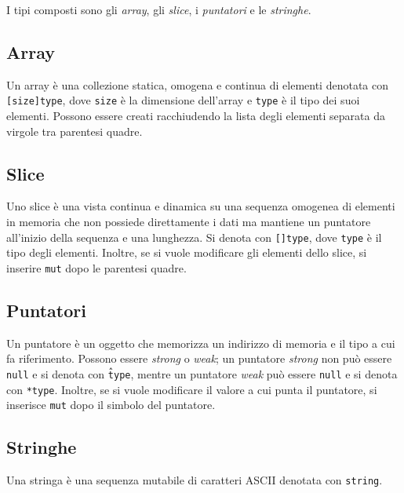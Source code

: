 I tipi composti sono gli \emph{array}, gli \emph{slice}, i \emph{puntatori} e le \emph{stringhe}.

\subsection{Array}

Un array \`e una collezione statica, omogena e continua di elementi denotata con \texttt{[size]type}, dove \texttt{size} \`e la dimensione dell'array e \texttt{type} \`e il tipo dei suoi elementi. Possono essere creati racchiudendo la lista degli elementi separata da virgole tra parentesi quadre.

\subsection{Slice}

Uno slice \`e una vista continua e dinamica su una sequenza omogenea di elementi in memoria che non possiede direttamente i dati ma mantiene un puntatore all'inizio della sequenza e una lunghezza. Si denota con \texttt{[]type}, dove \texttt{type} \`e il tipo degli elementi. Inoltre, se si vuole modificare gli elementi dello slice, si inserire \texttt{mut} dopo le parentesi quadre.

\subsection{Puntatori}

Un puntatore \`e un oggetto che memorizza un indirizzo di memoria e il tipo a cui fa riferimento. Possono essere \textit{strong} o \textit{weak}; un puntatore \textit{strong} non pu\`o essere \texttt{null} e si denota con \texttt{\^type}, mentre un puntatore \textit{weak} pu\`o essere \texttt{null} e si denota con \texttt{*type}. Inoltre, se si vuole modificare il valore a cui punta il puntatore, si inserisce \texttt{mut} dopo il simbolo del puntatore.

\subsection{Stringhe}

Una stringa \`e una sequenza mutabile di caratteri ASCII denotata con \texttt{string}.

%
%
